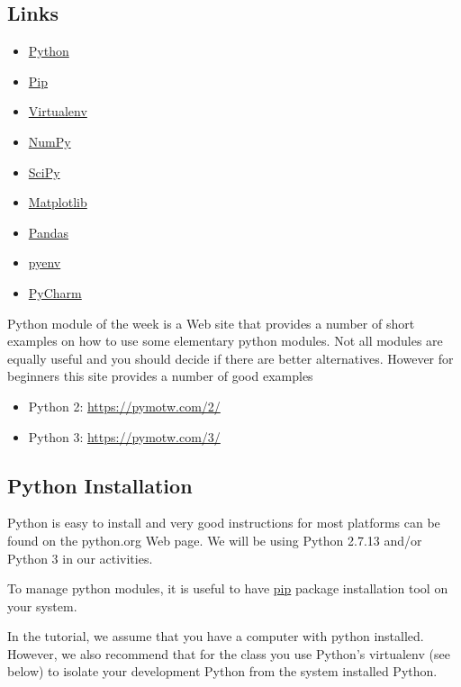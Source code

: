\subsection{Links}\label{links}

\begin{itemize}
\tightlist
\item
  \href{https://www.python.org/}{Python}
\item
  \href{https://pip.pypa.io/en/stable/}{Pip}
\item
  \href{https://virtualenv.pypa.io/en/stable/}{Virtualenv}
\item
  \href{http://www.numpy.org/}{NumPy}
\item
  \href{https://scipy.org/}{SciPy}
\item
  \href{http://matplotlib.org/}{Matplotlib}
\item
  \href{http://pandas.pydata.org/}{Pandas}
\item
  \href{https://github.com/pyenv/pyenv}{pyenv}
\item
  \href{https://github.com/pyenv/pyenv}{PyCharm}
\end{itemize}

Python module of the week is a Web site that provides a number of short
examples on how to use some elementary python modules. Not all modules
are equally useful and you should decide if there are better
alternatives. However for beginners this site provides a number of good
examples

\begin{itemize}
\tightlist
\item
  Python 2: \url{https://pymotw.com/2/}
\item
  Python 3: \url{https://pymotw.com/3/}
\end{itemize}

\subsection{Python Installation}\label{python-installation}

Python is easy to install and very good instructions for most platforms
can be found on the python.org Web page. We will be using Python 2.7.13
and/or Python 3 in our activities.

To manage python modules, it is useful to have
\href{https://pypi.python.org/pypi/pip}{pip} package installation tool
on your system.

In the tutorial, we assume that you have a computer with python
installed. However, we also recommend that for the class you use
Python's virtualenv (see below) to isolate your development Python from
the system installed Python.

